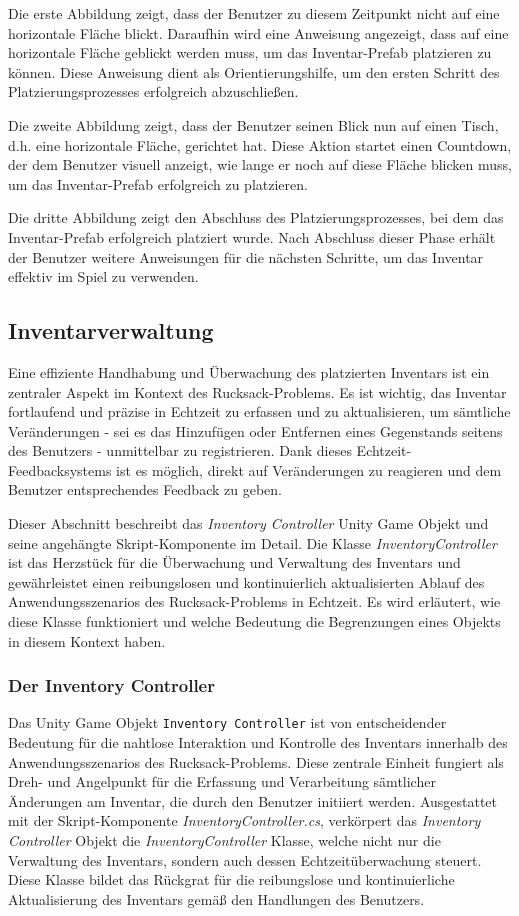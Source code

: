 Die erste Abbildung zeigt, dass der Benutzer zu diesem Zeitpunkt nicht auf eine horizontale Fläche blickt. Daraufhin
wird eine Anweisung angezeigt, dass auf eine horizontale Fläche geblickt werden muss, um das Inventar-Prefab platzieren
zu können. Diese Anweisung dient als Orientierungshilfe, um den ersten Schritt des Platzierungsprozesses erfolgreich
abzuschließen.

Die zweite Abbildung zeigt, dass der Benutzer seinen Blick nun auf einen Tisch, d.h. eine horizontale Fläche, gerichtet
hat. Diese Aktion startet einen Countdown, der dem Benutzer visuell anzeigt, wie lange er noch auf diese Fläche blicken
muss, um das Inventar-Prefab erfolgreich zu platzieren.

Die dritte Abbildung zeigt den Abschluss des Platzierungsprozesses, bei dem das Inventar-Prefab erfolgreich platziert
wurde. Nach Abschluss dieser Phase erhält der Benutzer weitere Anweisungen für die nächsten Schritte, um das Inventar
effektiv im Spiel zu verwenden.

\subsection{Inventarverwaltung}
Eine effiziente Handhabung und Überwachung des platzierten Inventars ist ein zentraler Aspekt im Kontext des Rucksack-Problems.
Es ist wichtig, das Inventar fortlaufend und präzise in Echtzeit zu erfassen und zu aktualisieren, um sämtliche Veränderungen -
sei es das Hinzufügen oder Entfernen eines Gegenstands seitens des Benutzers - unmittelbar zu registrieren. Dank dieses
Echtzeit-Feedbacksystems ist es möglich, direkt auf Veränderungen zu reagieren und dem Benutzer entsprechendes Feedback zu geben.

Dieser Abschnitt beschreibt das \textit{Inventory Controller} Unity Game Objekt und seine angehängte Skript-Komponente
im Detail. Die Klasse \textit{InventoryController} ist das Herzstück für die Überwachung und Verwaltung des Inventars
und gewährleistet einen reibungslosen und kontinuierlich aktualisierten Ablauf des Anwendungsszenarios des Rucksack-Problems
in Echtzeit. Es wird erläutert, wie diese Klasse funktioniert und welche Bedeutung die Begrenzungen eines Objekts in
diesem Kontext haben.

\subsubsection{Der Inventory Controller}
Das Unity Game Objekt \texttt{Inventory Controller} ist von entscheidender Bedeutung für die nahtlose Interaktion und
Kontrolle des Inventars innerhalb des Anwendungsszenarios des Rucksack-Problems. Diese zentrale Einheit fungiert als Dreh-
und Angelpunkt für die Erfassung und Verarbeitung sämtlicher Änderungen am Inventar, die durch den Benutzer initiiert
werden. Ausgestattet mit der Skript-Komponente \textit{InventoryController.cs}, verkörpert das \textit{Inventory Controller}
Objekt die \textit{InventoryController} Klasse, welche nicht nur die Verwaltung des Inventars, sondern auch dessen
Echtzeitüberwachung steuert. Diese Klasse bildet das Rückgrat für die reibungslose und kontinuierliche Aktualisierung
des Inventars gemäß den Handlungen des Benutzers.

